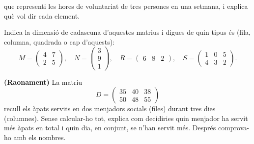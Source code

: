 \begin{exercicis}
\begin{exlist}
        que representi les hores de voluntariat de tres persones en una setmana, i
        explica què vol dir cada element.
  \item Indica la dimensió de cadascuna d'aquestes matrius i digues de quin tipus
        és (fila, columna, quadrada o cap d'aquests):
        \[ M=\begin{pmatrix} 4 & 7 \\ 2 & 5 \end{pmatrix},\quad
           N=\begin{pmatrix} 3 \\ 9 \\ 1 \end{pmatrix},\quad
           R=\begin{pmatrix} 6 & 8 & 2 \end{pmatrix},\quad
           S=\begin{pmatrix} 1 & 0 & 5 \\ 4 & 3 & 2 \end{pmatrix}. \]
  \item \textbf{(Raonament)} La matriu
        \[ D=\begin{pmatrix} 35 & 40 & 38 \\ 50 & 48 & 55 \end{pmatrix} \]
        recull els àpats servits en dos menjadors socials (files) durant tres dies
        (columnes). Sense calcular-ho tot, explica com decidiries quin menjador ha
        servit més àpats en total i quin dia, en conjunt, se n'han servit més.
        Després comprova-ho amb els nombres.
\end{exlist}
\end{exercicis}

